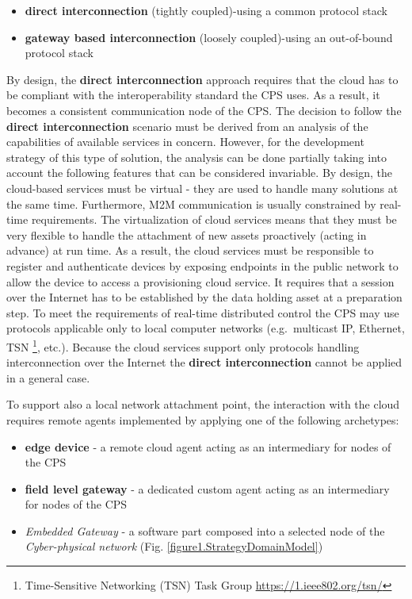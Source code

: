 \documentclass[runningheads]{llncs}
\begin{document}
\begin{itemize}
      \item \textbf{direct interconnection} (tightly coupled)-using a common protocol stack
      \item \textbf{gateway based interconnection} (loosely coupled)-using an out-of-bound protocol stack
\end{itemize}

By design, the \textbf{direct interconnection} approach requires that the cloud has to be compliant with the interoperability standard the CPS uses. As a result, it becomes a consistent communication node of the CPS. The decision to follow the \textbf{direct interconnection} scenario must be derived from an analysis of the capabilities of available services in concern. However, for the development strategy of this type of solution, the analysis can be done partially taking into account the following features that can be considered invariable. By design, the cloud-based services must be virtual - they are used to handle many solutions at the same time. Furthermore, M2M communication is usually constrained by real-time requirements. The virtualization of cloud services means that they must be very flexible to handle the attachment of new assets proactively (acting in advance) at run time. As a result, the cloud services must be responsible to register and authenticate devices by exposing endpoints in the public network to allow the device to access a provisioning cloud service. It requires that a session over the Internet has to be established by the data holding asset at a preparation step. To meet the requirements of real-time distributed control the CPS may use protocols applicable only to local computer networks (e.g.~multicast IP, Ethernet, TSN \footnote{Time-Sensitive Networking (TSN) Task Group \url{https://1.ieee802.org/tsn/}}, etc.). Because the cloud services support only protocols handling interconnection over the Internet the \textbf{direct interconnection} cannot be applied in a general case.

To support also a local network attachment point, the interaction with the cloud requires remote agents implemented by applying one of the following archetypes:

\begin{itemize}
      \item \textbf{edge device} - a remote cloud agent acting as an intermediary for nodes of the CPS
      \item \textbf{field level gateway} - a dedicated custom agent acting as an intermediary for nodes of the CPS
      \item \emph{Embedded Gateway} - a software part composed into a selected node of the \emph{Cyber-physical network} (Fig. \ref{figure1.StrategyDomainModel})
\end{itemize}
\end{document}
